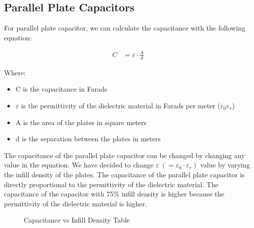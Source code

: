 \subsection{Parallel Plate Capacitors}

For parallel plate capacitor, we can calculate the capacitance with the following equation:

\begin{align*}
    C &= \varepsilon\cdot\frac{A}{d}
\end{align*}

Where:
\begin{itemize}
    \item C is the capacitance in Farads
    \item $\varepsilon$ is the permittivity of the dielectric material in Farads per meter ($\varepsilon_0\varepsilon_r$)
    \item A is the area of the plates in square meters
    \item d is the separation between the plates in meters
\end{itemize}

The capacitance of the parallel plate capacitor can be changed by changing any value in the equation. We have decided to change $\varepsilon~(=\varepsilon_0\cdot\boxed{\varepsilon_r})$ value by varying the infill density of the plates.
The capacitance of the parallel plate capacitor is directly proportional to the permittivity of the dielectric material. The capacitance of the capacitor with 75\% infill density is higher because the permittivity of the dielectric material is higher. 

\begin{figure}[h]
    \centering
    \caption{Capacitance vs Infill Density Table}
    \label{fig:capacitance-plot}
\end{figure}


